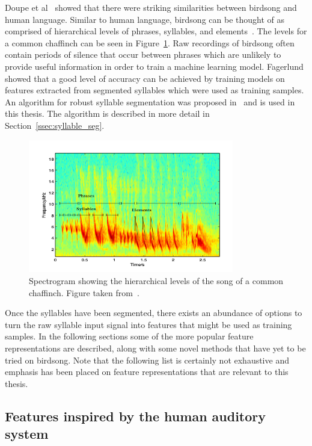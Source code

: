 Doupe et al~\cite{birdsongspeech} showed that there were striking similarities
between birdsong and human language. Similar to human language, birdsong can be
thought of as comprised of hierarchical levels of phrases, syllables, and
elements~\cite{catchpole2003bird}. The levels for a common chaffinch can be seen
in Figure~\ref{fig:syllables}. Raw recordings of birdsong
often contain periods of silence that occur between phrases which are unlikely
to provide useful information in order to train a machine learning model.
Fagerlund~\cite{fagerlund2007bird} showed that a good level of accuracy can be
achieved by training models on features extracted from segmented syllables which
were used as training samples. An algorithm for robust syllable segmentation was
proposed in~\cite{fagerlund2004automatic} and is used in this thesis. The
algorithm is described in more detail in Section~\ref{ssec:syllable_seg}.

\begin{figure}[ht]
  \centering
  \includegraphics[width=0.8\textwidth]{figures/syllables.png}
  \caption{Spectrogram showing the hierarchical levels of the song of a common
  chaffinch. Figure taken from~\cite{fagerlund2004automatic}.}\label{fig:syllables}
\end{figure}

Once the syllables have been segmented, there exists an abundance of options to
turn the raw syllable input signal into features that might be used as training
samples. In the following sections some of the more popular feature
representations are described, along with some novel methods that have yet to be
tried on birdsong. Note that the following list is certainly not exhaustive and
emphasis has been placed on feature representations that are relevant to this
thesis.

\subsection{Features inspired by the human auditory system}

